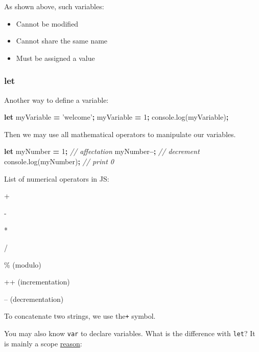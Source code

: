\documentclass[
]{book}
\newenvironment{Shaded}{\begin{snugshade}}{\end{snugshade}}
\newcommand{\AttributeTok}[1]{\textcolor[rgb]{0.77,0.63,0.00}{#1}}
\newcommand{\CommentTok}[1]{\textcolor[rgb]{0.56,0.35,0.01}{\textit{#1}}}
\newcommand{\DecValTok}[1]{\textcolor[rgb]{0.00,0.00,0.81}{#1}}
\newcommand{\KeywordTok}[1]{\textcolor[rgb]{0.13,0.29,0.53}{\textbf{#1}}}
\newcommand{\NormalTok}[1]{#1}
\newcommand{\OperatorTok}[1]{\textcolor[rgb]{0.81,0.36,0.00}{\textbf{#1}}}
\newcommand{\StringTok}[1]{\textcolor[rgb]{0.31,0.60,0.02}{#1}}
\newcommand{\VariableTok}[1]{\textcolor[rgb]{0.00,0.00,0.00}{#1}}
\providecommand{\tightlist}{%
  \setlength{\itemsep}{0pt}\setlength{\parskip}{0pt}}
\begin{document}
As shown above, such variables:

\begin{itemize}
\tightlist
\item
  Cannot be modified
\item
  Cannot share the same name
\item
  Must be assigned a value
\end{itemize}

\hypertarget{let}{%
\subsubsection{let}\label{let}}

Another way to define a variable:

\begin{Shaded}
\begin{Highlighting}[]
\KeywordTok{let}\NormalTok{ myVariable }\OperatorTok{=} \StringTok{'welcome'}\OperatorTok{;}
\NormalTok{myVariable }\OperatorTok{=} \DecValTok{1}\OperatorTok{;}
\VariableTok{console}\NormalTok{.}\AttributeTok{log}\NormalTok{(myVariable)}\OperatorTok{;}
\end{Highlighting}
\end{Shaded}

Then we may use all mathematical operators to manipulate our variables.

\begin{Shaded}
\begin{Highlighting}[]
\KeywordTok{let}\NormalTok{ myNumber }\OperatorTok{=} \DecValTok{1}\OperatorTok{;} \CommentTok{// affectation}
\NormalTok{myNumber}\OperatorTok{--;} \CommentTok{// decrement}
\VariableTok{console}\NormalTok{.}\AttributeTok{log}\NormalTok{(myNumber)}\OperatorTok{;} \CommentTok{// print 0}
\end{Highlighting}
\end{Shaded}

List of numerical operators in JS:

+

-

*

/

\% (modulo)

++ (incrementation)

-- (decrementation)

To concatenate two strings, we use the\texttt{+} symbol.

You may also know \texttt{var} to declare variables. What is the difference with \texttt{let}? It is mainly a scope \href{https://www.w3schools.com/js/js_let.asp}{reason}:
\end{document}
